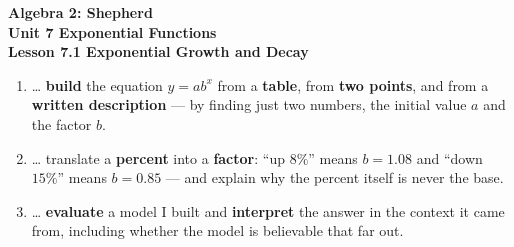 \documentclass[10pt]{article}
\begin{document}
\vspace{-0.8in}

\begin{center}
  {\color{white}\textbf{\LARGE Algebra 2: Shepherd}}\\[4pt]
  {\color{forestmid}\large\textbf{Unit 7 \quad Exponential Functions}}\\[6pt]
  {\color{white}\textbf{\large Lesson 7.1 \quad Exponential Growth and Decay}}
\end{center}

\vspace{0.22in}
\namedateperiod
\vspace{0.18in}

\begin{learningtargetbox}
\small
\begin{enumerate}[leftmargin=1.5em, itemsep=5pt]
  \item \ldots{} \textbf{build} the equation $y=ab^{x}$ from a \textbf{table}, from \textbf{two points}, and from a \textbf{written description} --- by finding just two numbers, the initial value $a$ and the factor $b$.
  \item \ldots{} translate a \textbf{percent} into a \textbf{factor}: ``up $8\%$'' means $b=1.08$ and ``down $15\%$'' means $b=0.85$ --- and explain why the percent itself is never the base.
  \item \ldots{} \textbf{evaluate} a model I built and \textbf{interpret} the answer in the context it came from, including whether the model is believable that far out.
\end{enumerate}
\end{learningtargetbox}

\vspace{0.14in}
\end{document}
